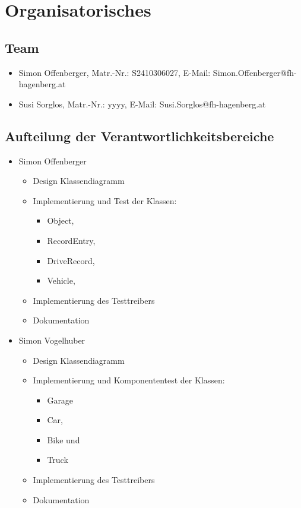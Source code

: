 \documentclass[12pt,naustrian,a4widepaper]{scrartcl}
\begin{document}
\section{Organisatorisches}

\subsection{Team}
\begin{itemize}
	\item Simon Offenberger, Matr.-Nr.: S2410306027, E-Mail: Simon.Offenberger@fh-hagenberg.at	
	\item Susi Sorglos, Matr.-Nr.: yyyy, E-Mail: Susi.Sorglos@fh-hagenberg.at	
\end{itemize}

\subsection{Aufteilung der Verantwortlichkeitsbereiche}
\begin{itemize}
	\item Simon Offenberger
		\begin{itemize}
			\item Design Klassendiagramm
			\item Implementierung und Test der Klassen: 
			\begin{itemize}
				\item Object,
				\item RecordEntry, 
				\item DriveRecord,
				\item Vehicle,
			\end{itemize}
			\item Implementierung des Testtreibers
			\item Dokumentation
		\end{itemize}
	\item Simon Vogelhuber
		\begin{itemize}
			\item Design Klassendiagramm
			\item Implementierung und Komponententest der Klassen: 
			\begin{itemize}
				\item Garage
				\item Car, 
				\item Bike und  
				\item Truck 
			\end{itemize}
			\item Implementierung des Testtreibers
			\item Dokumentation
		\end{itemize}	
\end{itemize}
\end{document}
